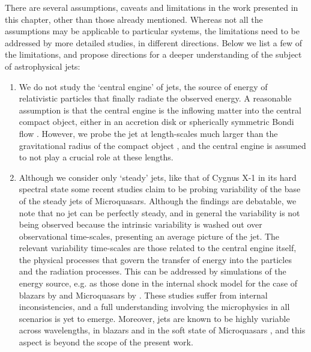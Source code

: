 There are several assumptions, caveats and limitations in the work presented in this chapter, other than those already mentioned. Whereas not all the assumptions may be applicable to particular systems, the limitations need to be addressed by more detailed studies, in different directions. Below we list a few of the limitations, and propose directions for a deeper understanding of the subject of astrophysical jets:

\begin{enumerate}
\item We do not study the `central engine' of jets, the source of energy of relativistic particles that finally radiate the observed energy. A reasonable assumption is that the central engine is the inflowing matter into the central compact object, either in an accretion disk \citep{Shakura_&_Sunayev-1973-AAp} or spherically symmetric Bondi flow \citep{Bondi-1952-MNRAS}. However, we probe the jet at length-scales much larger than the gravitational radius of the compact object , and the central engine is assumed to not play a crucial role at these lengths.

\item Although we consider only `steady' jets, like that of Cygnus X-1 in its hard spectral state  some recent studies \citep{Gandhi_et_al.-2011-ApJ} claim to be probing variability of the base of the steady jets of Microquasars. Although the findings are debatable, we note that no jet can be perfectly steady, and in general the variability is not being observed because the intrinsic variability is washed out over observational time-scales, presenting an average picture of the jet. The relevant variability time-scales are those related to the central engine itself, the physical processes that govern the transfer of energy into the particles and the radiation processes. This can be addressed by simulations of the energy source, e.g. as those done in the internal shock model for the case of blazars by \cite{Joshi_&_Bottcher-2007-ApJ} and Microquasars by \cite{Jamil_et_al.-2010-MNRAS}. These studies suffer from internal inconsistencies, and a full understanding involving the microphysics in all scenarios is yet to emerge. Moreover, jets are known to be highly variable across wavelengths, in blazars \citep{Kushwaha_et_al.-2013-MNRAS, Agarwal_et_al.-2015-MNRAS, Agarwal_et_al.-2016-MNRAS} and in the soft state of Microquasars \citep{Mirabel_&_Rodriguez-1994-Nature}, and this aspect is beyond the scope of the present work.


\end{enumerate}
